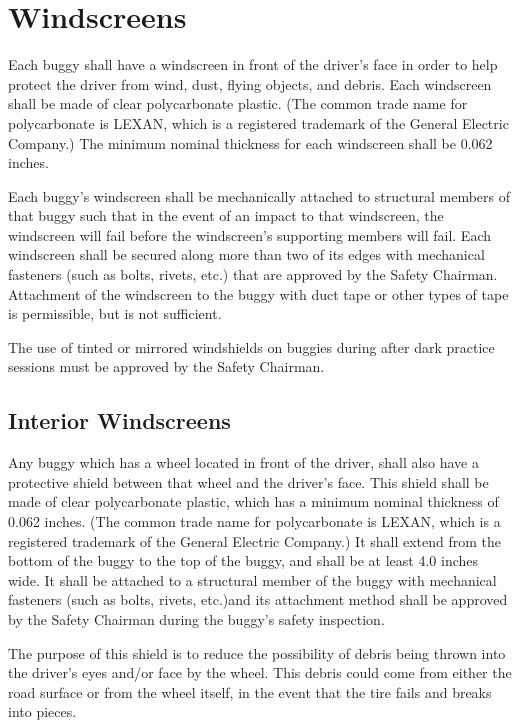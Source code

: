 \documentclass[openany]{book}
\begin{document}
\section{Windscreens}

Each buggy shall have a windscreen in front of the driver's face in order to help protect the driver from wind, dust, flying objects, and debris. Each windscreen shall be made of clear polycarbonate plastic. (The common trade name for polycarbonate is LEXAN, which is a registered trademark of the General Electric Company.) The minimum nominal thickness for each windscreen shall be 0.062 inches.

Each buggy's windscreen shall be mechanically attached to structural members of that buggy such that in the event of an impact to that windscreen, the windscreen will fail before the windscreen's supporting members will fail. Each windscreen shall be secured along more than two of its edges with mechanical fasteners (such as bolts, rivets, etc.) that are approved by the Safety Chairman. Attachment of the windscreen to the buggy with duct tape or other types of tape is permissible, but is not sufficient.

The use of tinted or mirrored windshields on buggies during after dark practice sessions must be approved by the Safety Chairman.

\subsection{Interior Windscreens}

Any buggy which has a wheel located in front of the driver, shall also have a protective shield between that wheel and the driver's face. This shield shall be made of clear polycarbonate plastic, which has a minimum nominal thickness of 0.062 inches. (The common trade name for polycarbonate is LEXAN, which is a registered trademark of the General Electric Company.) It shall extend from the bottom of the buggy to the top of the buggy, and shall be at least 4.0 inches wide. It shall be attached to a structural member of the buggy with mechanical fasteners (such as bolts, rivets, etc.)and its attachment method shall be approved by the Safety Chairman during the buggy's safety inspection.

The purpose of this shield is to reduce the possibility of debris being thrown into the driver's eyes and/or face by the wheel. This debris could come from either the road surface or from the wheel itself, in the event that the tire fails and breaks into pieces.
\end{document}
